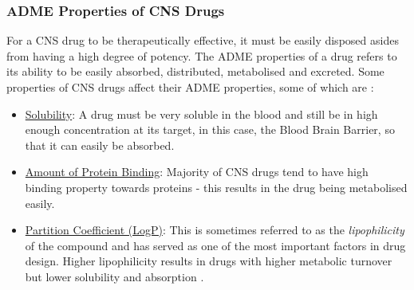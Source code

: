 \documentclass[a4paper,12pt]{report}
\begin{document}
		\subsubsection{ADME Properties of CNS Drugs}
		For a CNS drug to be therapeutically effective, it must be easily disposed asides from having a high degree of potency. The ADME properties of a drug refers to its ability to be easily absorbed, distributed, metabolised and excreted. Some properties of CNS drugs affect their ADME properties, some of which are \cite{Hassanetal2005}:
			\begin{itemize}
				\item \underline{Solubility}: A drug must be very soluble in the blood and still be in high enough concentration at its target, in this case, the Blood Brain Barrier, so that it can easily be absorbed.
				\item \underline{Amount of Protein Binding}: Majority of CNS drugs tend to have high binding property towards proteins - this results in the drug being metabolised easily.
				\item \underline{Partition Coefficient (LogP)}: This is sometimes referred to as the \textit{lipophilicity} of the compound and has served as one of the most important factors in drug design. Higher lipophilicity results in drugs with higher metabolic turnover but lower solubility and absorption \cite{Hassanetal2005}. 
			\end{itemize}

	
	
\end{document}
